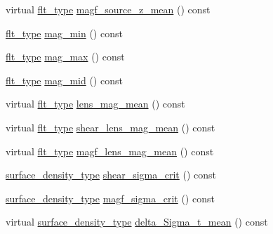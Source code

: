 \begin{DoxyCompactItemize}
\item 
virtual \hyperlink{lib_2IceBRG__main_2common_8h_ad0f130a56eeb944d9ef2692ee881ecc4}{flt\-\_\-type} \hyperlink{classIceBRG_1_1pair__bin__summary_a4b22342ef48562c44470e7de70ae7860}{magf\-\_\-source\-\_\-z\-\_\-mean} () const 
\item 
\hyperlink{lib_2IceBRG__main_2common_8h_ad0f130a56eeb944d9ef2692ee881ecc4}{flt\-\_\-type} \hyperlink{classIceBRG_1_1pair__bin__summary_a40cc6096a80b23659359b0a58f10cae2}{mag\-\_\-min} () const 
\item 
\hyperlink{lib_2IceBRG__main_2common_8h_ad0f130a56eeb944d9ef2692ee881ecc4}{flt\-\_\-type} \hyperlink{classIceBRG_1_1pair__bin__summary_a9a13a840877d52c2eb0387e3ca7f9a70}{mag\-\_\-max} () const 
\item 
\hyperlink{lib_2IceBRG__main_2common_8h_ad0f130a56eeb944d9ef2692ee881ecc4}{flt\-\_\-type} \hyperlink{classIceBRG_1_1pair__bin__summary_afe7c6362d8892d5d0183afbe81e4ccbf}{mag\-\_\-mid} () const 
\item 
virtual \hyperlink{lib_2IceBRG__main_2common_8h_ad0f130a56eeb944d9ef2692ee881ecc4}{flt\-\_\-type} \hyperlink{classIceBRG_1_1pair__bin__summary_ac7f6568e96ca05b14958903473a5f65b}{lens\-\_\-mag\-\_\-mean} () const 
\item 
virtual \hyperlink{lib_2IceBRG__main_2common_8h_ad0f130a56eeb944d9ef2692ee881ecc4}{flt\-\_\-type} \hyperlink{classIceBRG_1_1pair__bin__summary_aa65e60d6efdb5fe7ac9d1be02c851780}{shear\-\_\-lens\-\_\-mag\-\_\-mean} () const 
\item 
virtual \hyperlink{lib_2IceBRG__main_2common_8h_ad0f130a56eeb944d9ef2692ee881ecc4}{flt\-\_\-type} \hyperlink{classIceBRG_1_1pair__bin__summary_aa8b997144d0aaefce6bfbb0fb0f6f138}{magf\-\_\-lens\-\_\-mag\-\_\-mean} () const 
\item 
\hyperlink{namespaceIceBRG_a80c597ef5ba0a32491d32a9f0083b02d}{surface\-\_\-density\-\_\-type} \hyperlink{classIceBRG_1_1pair__bin__summary_a7ddaece5334f32fe97ab2e3ed0f211e9}{shear\-\_\-sigma\-\_\-crit} () const 
\item 
\hyperlink{namespaceIceBRG_a80c597ef5ba0a32491d32a9f0083b02d}{surface\-\_\-density\-\_\-type} \hyperlink{classIceBRG_1_1pair__bin__summary_a88693451cb28ec4f8e8c67eb34a270f8}{magf\-\_\-sigma\-\_\-crit} () const 
\item 
virtual \hyperlink{namespaceIceBRG_a80c597ef5ba0a32491d32a9f0083b02d}{surface\-\_\-density\-\_\-type} \hyperlink{classIceBRG_1_1pair__bin__summary_a2a1372bfa03a186425920b839ce38f4a}{delta\-\_\-\-Sigma\-\_\-t\-\_\-mean} () const 
\item 

\end{DoxyCompactItemize}
